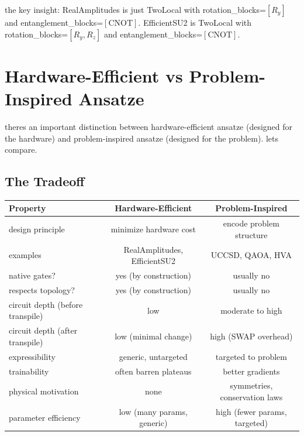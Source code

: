 \documentclass[11pt,a4paper]{article}
\theoremstyle{definition}
\theoremstyle{remark}
\begin{document}
the key insight: RealAmplitudes is just TwoLocal with rotation\_blocks=$[R_y]$ and entanglement\_blocks=$[\text{CNOT}]$. EfficientSU2 is TwoLocal with rotation\_blocks=$[R_y, R_z]$ and entanglement\_blocks=$[\text{CNOT}]$.

\section{Hardware-Efficient vs Problem-Inspired Ansatze}

theres an important distinction between hardware-efficient ansatze (designed for the hardware) and problem-inspired ansatze (designed for the problem). lets compare.

\subsection{The Tradeoff}

\begin{center}
\renewcommand{\arraystretch}{1.4}
\begin{tabular}{|l|c|c|}
\hline
\textbf{Property} & \textbf{Hardware-Efficient} & \textbf{Problem-Inspired} \\
\hline
design principle & minimize hardware cost & encode problem structure \\
\hline
examples & RealAmplitudes, EfficientSU2 & UCCSD, QAOA, HVA \\
\hline
native gates? & yes (by construction) & usually no \\
\hline
respects topology? & yes (by construction) & usually no \\
\hline
circuit depth (before transpile) & low & moderate to high \\
\hline
circuit depth (after transpile) & low (minimal change) & high (SWAP overhead) \\
\hline
expressibility & generic, untargeted & targeted to problem \\
\hline
trainability & often barren plateaus & better gradients \\
\hline
physical motivation & none & symmetries, conservation laws \\
\hline
parameter efficiency & low (many params, generic) & high (fewer params, targeted) \\
\hline
\end{tabular}
\end{center}
\end{document}
